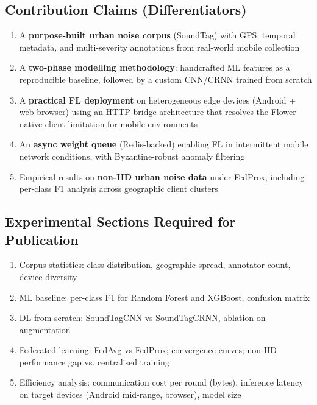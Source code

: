 \documentclass[11pt,a4paper]{article}
\begin{document}
\subsection{Contribution Claims (Differentiators)}

\begin{enumerate}[leftmargin=*,noitemsep]
  \item A \textbf{purpose-built urban noise corpus} (SoundTag) with GPS, temporal
        metadata, and multi-severity annotations from real-world mobile collection
  \item A \textbf{two-phase modelling methodology}: handcrafted ML features as a
        reproducible baseline, followed by a custom CNN/CRNN trained from scratch
  \item A \textbf{practical FL deployment} on heterogeneous edge devices
        (Android + web browser) using an HTTP bridge architecture that resolves the
        Flower native-client limitation for mobile environments
  \item An \textbf{async weight queue} (Redis-backed) enabling FL in intermittent
        mobile network conditions, with Byzantine-robust anomaly filtering
  \item Empirical results on \textbf{non-IID urban noise data} under FedProx,
        including per-class F1 analysis across geographic client clusters
\end{enumerate}

\subsection{Experimental Sections Required for Publication}

\begin{enumerate}[leftmargin=*,noitemsep]
  \item Corpus statistics: class distribution, geographic spread, annotator count,
        device diversity
  \item ML baseline: per-class F1 for Random Forest and XGBoost, confusion matrix
  \item DL from scratch: SoundTagCNN vs SoundTagCRNN, ablation on augmentation
  \item Federated learning: FedAvg vs FedProx; convergence curves; non-IID
        performance gap vs. centralised training
  \item Efficiency analysis: communication cost per round (bytes), inference
        latency on target devices (Android mid-range, browser), model size
\end{enumerate}
\end{document}
